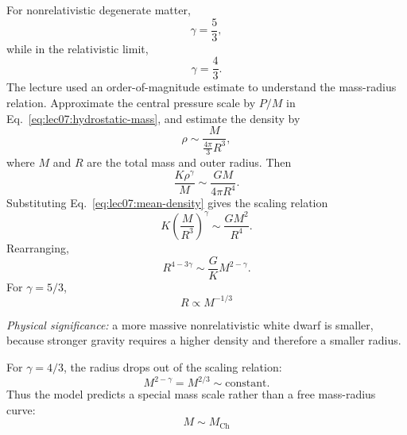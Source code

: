 For nonrelativistic degenerate matter,
\begin{equation}
    \gamma=\frac{5}{3},
    \label{eq:lec07:gamma-nonrel}
\end{equation}
while in the relativistic limit,
\begin{equation}
    \gamma=\frac{4}{3}.
    \label{eq:lec07:gamma-rel}
\end{equation}
The lecture used an order-of-magnitude estimate to understand the
mass-radius relation. Approximate the central pressure scale by
$P/M$ in Eq.~\eqref{eq:lec07:hydrostatic-mass}, and estimate the density by
\begin{equation}
    \rho\sim \frac{M}{\frac{4\pi}{3}R^3},
    \label{eq:lec07:mean-density}
\end{equation}
where $M$ and $R$ are the total mass and outer radius. Then
\begin{equation}
    \frac{K\rho^\gamma}{M}
    \sim \frac{GM}{4\pi R^4}.
    \label{eq:lec07:scaling-balance-start}
\end{equation}
Substituting Eq.~\eqref{eq:lec07:mean-density} gives the scaling relation
\begin{equation}
    K\left(\frac{M}{R^3}\right)^\gamma
    \sim \frac{GM^2}{R^4}.
    \label{eq:lec07:scaling-balance}
\end{equation}
Rearranging,
\begin{equation}
    R^{4-3\gamma}\sim
    \frac{G}{K}M^{2-\gamma}.
    \label{eq:lec07:mass-radius-general}
\end{equation}
For $\gamma=5/3$,
\begin{equation}
    \boxed{R\propto M^{-1/3}}
    \label{eq:lec07:mass-radius-nonrel}
\end{equation}

\textit{Physical significance:} a more massive nonrelativistic white dwarf
is smaller, because stronger gravity requires a higher density and therefore
a smaller radius.

For $\gamma=4/3$, the radius drops out of the scaling relation:
\begin{equation}
    M^{2-\gamma}=M^{2/3}\sim \text{constant}.
    \label{eq:lec07:mass-limit-scaling}
\end{equation}
Thus the model predicts a special mass scale rather than a free
mass-radius curve:
\begin{equation}
    \boxed{M\sim M_{\mathrm{Ch}}}
    \label{eq:lec07:chandrasekhar-scale}
\end{equation}

